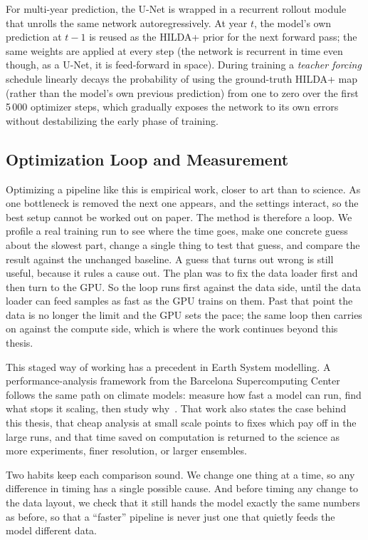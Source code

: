 \documentclass[12pt,a4paper]{article}
\begin{document}
For multi-year prediction, the U-Net is wrapped in a recurrent rollout module that unrolls
the same network autoregressively. At year $t$, the model's own prediction at $t-1$ is
reused as the HILDA+ prior for the next forward pass; the same weights are applied at every
step (the network is recurrent in time even though, as a U-Net, it is feed-forward in
space). During training a \emph{teacher forcing} schedule linearly decays the probability
of using the ground-truth HILDA+ map (rather than the model's own previous prediction) from
one to zero over the first 5\,000 optimizer steps, which gradually exposes the network to
its own errors without destabilizing the early phase of training.

\subsection{Optimization Loop and Measurement}

Optimizing a pipeline like this is empirical work, closer to art than to science. As one
bottleneck is removed the next one appears, and the settings interact, so the best setup cannot
be worked out on paper. The method is therefore a loop. We profile a real training run to see
where the time goes, make one concrete guess about the slowest part, change a single thing to
test that guess, and compare the result against the unchanged baseline. A guess that turns out
wrong is still useful, because it rules a cause out. The plan was to fix the data loader first
and then turn to the GPU. So the loop runs first against the data side, until the data loader can
feed samples as fast as the GPU trains on them. Past that point the data is no longer the limit
and the GPU sets the pace; the same loop then carries on against the compute side, which is where
the work continues beyond this thesis.

This staged way of working has a precedent in Earth System modelling. A performance-analysis
framework from the Barcelona Supercomputing Center follows the same path on climate models:
measure how fast a model can run, find what stops it scaling, then study why~\cite{tinto2019mpi}.
That work also states the case behind this thesis, that cheap analysis at small scale points to
fixes which pay off in the large runs, and that time saved on computation is returned to the
science as more experiments, finer resolution, or larger ensembles.

Two habits keep each comparison sound. We change one thing at a time, so any difference in
timing has a single possible cause. And before timing any change to the data layout, we check
that it still hands the model exactly the same numbers as before, so that a ``faster'' pipeline
is never just one that quietly feeds the model different data.
\end{document}
